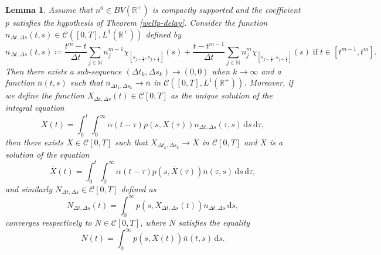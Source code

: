 \documentclass[11pt,a4paper]{article}
\newcommand{\R}{\mathbb{R}}
\newcommand{\N}{\mathbb{N}}
\newcommand{\dd}{\mathrm{d}}
\newtheorem{lemma}{Lemma}[section]
\begin{document}
\begin{lemma}
\label{lim-delta-d}
    Assume that $n^0\in BV(\R^+)$ is compactly supported and the coefficient $p$ satisfies the hypothesis of Theorem \ref{wellp-delay}. Consider the function $n_{\Delta t,\Delta s}(t,s)\in\mathcal{C}\left([0,T],L^1(\R^+)\right)$ defined by
    \begin{equation*}
    n_{\Delta t,\Delta s}(t,s)\coloneqq\frac{t^m-t}{\Delta t}\sum_{j\in\N}n_j^{m-1}\chi_{[s_{j-\frac{1}{2}},s_{j+\frac{1}{2}}]}(s)+\frac{t-t^{m-1}}{\Delta t}\sum_{j\in\N}n_j^{m}\chi_{[s_{j-\frac{1}{2}},s_{j+\frac{1}{2}}]}(s)\;\textrm{if}\;t\in[t^{m-1},t^{m}].
    \end{equation*}
    Then there exists a sub-sequence $(\Delta t_k,\Delta s_k)\to (0,0)$ when $k\to\infty$ and a function $\overline{n}(t,s)$ such that $n_{\Delta t_k,\Delta s_k}\to\overline{n}$ in $\mathcal{C}\left([0,T],L^1(\R^+)\right)$. Moreover, if we define the function $X_{\Delta t,\Delta s}(t)\in\mathcal{C}[0,T]$ as the unique solution of the integral equation
    \begin{equation*}
    X(t)=\int_0^t\int_0^\infty\alpha(t-\tau)p(s,X(\tau))n_{\Delta t,\Delta s}(\tau,s)\,\dd s\,\dd \tau,
    \end{equation*}
   then there exists $\overline{X}\in\mathcal{C}[0,T]$ such that $X_{\Delta t_k,\Delta s_k}\to\overline{X}$ in $\mathcal{C}[0,T]$ and $\overline{X}$ is a solution of the equation
   \begin{equation}
   \label{lim-Xbar}
       \overline{X}(t)=\int_0^t\int_0^\infty\alpha(t-\tau)p(s,\overline{X}(\tau))\overline{n}(\tau,s)\,\dd s\,\dd \tau,
   \end{equation}
   and similarly $N_{\Delta t,\Delta s}\in\mathcal{C}[0,T]$ defined as 
  \begin{equation*}
   N_{\Delta t,\Delta s}(t)=\int_0^\infty p\left(s,X_{\Delta t,\Delta s}(t)\right)n_{\Delta t,\Delta s}\,\dd s,
  \end{equation*}
   converges respectively to $\overline{N}\in\mathcal{C}[0,T]$, where $\overline{N}$ satisfies the equality
   \begin{equation}
    \label{lim-Nbar-d}
       \overline{N}(t)=\int_0^\infty p(s,\overline{X}(t))\overline{n}(t,s)\,\dd s.
   \end{equation}
 \end{lemma}
\end{document}
